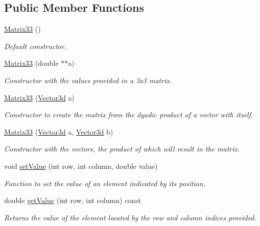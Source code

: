 \subsection*{Public Member Functions}
\begin{DoxyCompactItemize}
\item 
\hyperlink{classMatrix33_a70acb6647b172d017cc4265a29a7d263}{Matrix33} ()
\begin{DoxyCompactList}\small\item\em Default constructor. \end{DoxyCompactList}\item 
\hyperlink{classMatrix33_a4399c6da8f1ac31ce514550282c823cf}{Matrix33} (double $\ast$$\ast$a)
\begin{DoxyCompactList}\small\item\em Constructor with the values provided in a 3x3 matrix. \end{DoxyCompactList}\item 
\hyperlink{classMatrix33_a1f070a29a710043c38b56cee8214e6f7}{Matrix33} (\hyperlink{classVector3d}{Vector3d} a)
\begin{DoxyCompactList}\small\item\em Constructor to create the matrix from the dyadic product of a vector with itself. \end{DoxyCompactList}\item 
\hyperlink{classMatrix33_a7f1deae895c26e47c39c76bfaa31d3d2}{Matrix33} (\hyperlink{classVector3d}{Vector3d} a, \hyperlink{classVector3d}{Vector3d} b)
\begin{DoxyCompactList}\small\item\em Constructor with the vectors, the product of which will result in the matrix. \end{DoxyCompactList}\item 
void \hyperlink{classMatrix33_a6cdcec77fd089b2e73ad7ae85ecff30b}{set\-Value} (int row, int column, double value)
\begin{DoxyCompactList}\small\item\em Function to set the value of an element indicated by its position. \end{DoxyCompactList}\item 
double \hyperlink{classMatrix33_ab53b3e37ad830a87a804cf26311ba088}{get\-Value} (int row, int column) const 
\begin{DoxyCompactList}\small\item\em Returns the value of the element located by the row and column indices provided. \end{DoxyCompactList}\item 
$$
\end{DoxyCompactItemize}
